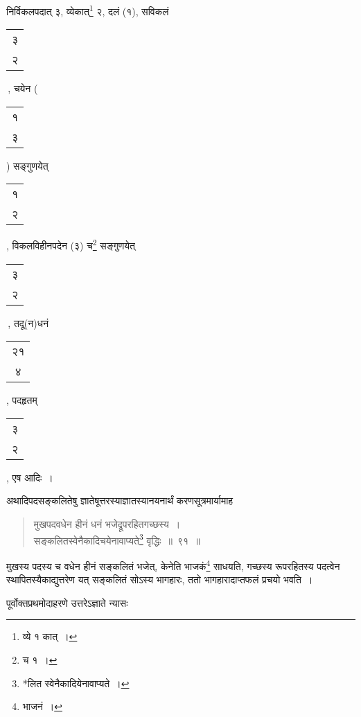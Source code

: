 \documentclass[10pt, openany]{book}
\begin{document}
{{{{{{{{निर्विकलपदात् ३, व्येकात्\renewcommand{\thefootnote}{१०}\footnote {व्ये १ कात्~।}  २, दलं (१), सविकलं \begin{tabular}{c|}३\\ २\\\hline \end{tabular}\,, चयेन \bigg(\begin{tabular}{c}१\\ ३\end{tabular}\bigg)
सङ्गुणयेत्\begin{tabular}{c}१\\ २\end{tabular}, विकलविहीनपदेन (३) च\renewcommand{\thefootnote}{११}\footnote {च १~।}  सङ्गुणयेत् \begin{tabular}{c|}३\\ २\\\hline \end{tabular}\,,
तदू(न)धनं\begin{tabular}{c}२१\\ ४\end{tabular}, पदहृतम्\begin{tabular}{c}३ \\२\end{tabular}, एष आदिः~।}
\vspace{3mm}

{अथादिपदसङ्कलितेषु ज्ञातेषूत्तरस्याज्ञातस्यानयनार्थं
करणसूत्रमार्यामाह\textendash}

 \label{91}
\begin{quote}
    
{\bs मुखपदवधेन हीनं धनं भजेद्रूपरहितगच्छस्य~।\\
 सङ्कलितस्वेनैकादिचयेनावाप्यते\renewcommand{\thefootnote}{१२}\footnote {*लित स्वेनैकादियेनावाप्यते~।}  वृद्धिः~॥~९१~॥}\end{quote}
 
{मुखस्य पदस्य च वधेन हीनं सङ्कलितं भजेत्, केनेति भाजकं\renewcommand{\thefootnote}{१३}\footnote {भाजनं~।}  साधयति,
गच्छस्य}
{रूपरहितस्य पदत्वेन स्थापितस्यैकाद्युत्तरेण यत् सङ्कलितं सोऽस्य भागहारः,
ततो भागहारादाप्तफलं प्रचयो भवति~।}
\vspace{3mm}

{पूर्वोक्तप्रथमोदाहरणे उत्तरेऽज्ञाते न्यासः\textendash \,
\vspace{2mm}


}}}}}}}}
\end{document}
